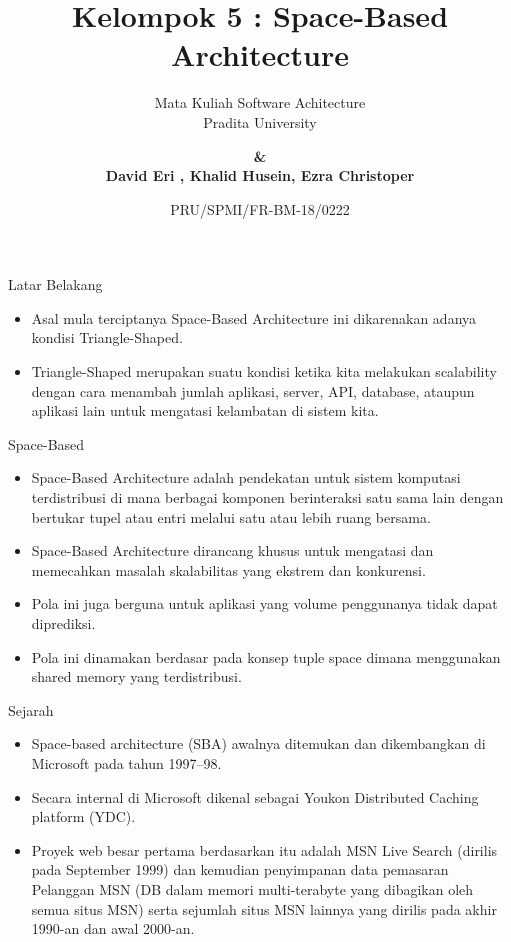 \documentclass[aspectratio=169, table]{beamer}
\subtitle{Mata Kuliah Software Achitecture\\Pradita University}
\title{\vskip-0.7cm \Large Kelompok 5 : Space-Based Architecture}
\date[Serial]{\scriptsize {PRU/SPMI/FR-BM-18/0222}}
\author[Pradita]{\small {\textbf{\&\\ David Eri , Khalid Husein, Ezra Christoper }}}
\begin{document}
	
	\begin{frame}[plain]
		\maketitle
	\end{frame}
	
	\begin{frame}{Latar Belakang}
		\begin{itemize}
			\item Asal mula terciptanya Space-Based Architecture ini dikarenakan adanya kondisi Triangle-Shaped.
			\item Triangle-Shaped merupakan suatu kondisi ketika kita melakukan scalability dengan cara menambah jumlah aplikasi, server, API, database, ataupun aplikasi lain untuk mengatasi kelambatan di sistem kita.
		\end{itemize}
	\end{frame}
	
	\begin{frame}{Space-Based}
		\begin{itemize}
			\item Space-Based Architecture adalah pendekatan untuk sistem komputasi terdistribusi di mana berbagai komponen berinteraksi satu sama lain dengan bertukar tupel atau entri melalui satu atau lebih ruang bersama.
			\item Space-Based Architecture dirancang khusus untuk mengatasi dan memecahkan masalah skalabilitas yang ekstrem dan konkurensi.
			\item Pola ini juga berguna untuk aplikasi yang volume penggunanya tidak dapat diprediksi.
			\item Pola ini dinamakan berdasar pada konsep tuple space dimana menggunakan shared memory yang terdistribusi.
		\end{itemize}
	\end{frame}
	

	
	\begin{frame}{Sejarah}
		\begin{itemize}
			\item Space-based architecture (SBA) awalnya ditemukan dan dikembangkan di Microsoft pada tahun 1997–98.
			\item Secara internal di Microsoft dikenal sebagai Youkon Distributed Caching platform (YDC).
			\item Proyek web besar pertama berdasarkan itu adalah MSN Live Search (dirilis pada September 1999) dan kemudian penyimpanan data pemasaran Pelanggan MSN (DB dalam memori multi-terabyte yang dibagikan oleh semua situs MSN) serta sejumlah situs MSN lainnya yang dirilis pada akhir 1990-an dan awal 2000-an.
		\end{itemize}
	\end{frame}
	
\end{document}
